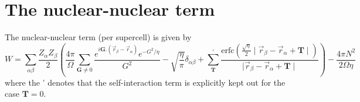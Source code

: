 \documentclass[11pt,a4paper]{article}
\begin{document}
\section{The nuclear-nuclear term}
The nuclear-nuclear term (per supercell) is given by
\begin{equation}
W = \sum\limits_{\alpha\beta} \frac{Z_{\alpha}Z_{\beta}}{2} \left( \frac{4\pi}{\Omega} \sum\limits_{\mathbf{G} \neq 0} \frac{e^{i \mathbf{G}.(\vec{r}_{\beta} - \vec{r}_{\alpha})} e^{-G^2/\eta}}{G^2} - \sqrt{\frac{\eta}{\pi}} \delta_{\alpha\beta} + \sum\limits_{\mathbf{T}}^{'} \frac{\text{erfc}\left( \frac{\sqrt{\eta}}{2} \mid \vec{r}_{\beta} - \vec{r}_{\alpha} + \mathbf{T} \mid \right)}{\mid \vec{r}_{\beta} - \vec{r}_{\alpha} + \mathbf{T} \mid}  \right) - \frac{4 \pi N^2}{2 \Omega \eta} \label{gjgj3}
\end{equation}
where the ' denotes that the self-interaction term is explicitly kept out for the case $\mathbf{T} = 0$.
\end{document}
